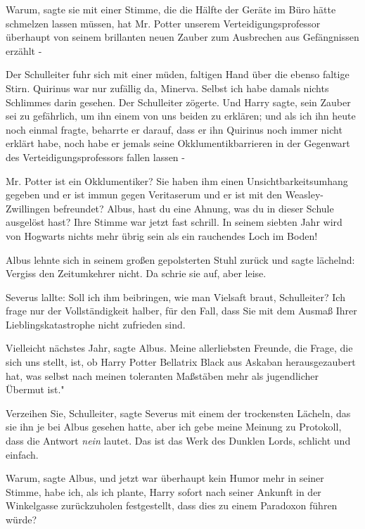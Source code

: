 \glqq{}Warum\grqq{}, sagte sie mit einer Stimme, die die Hälfte der Geräte im
Büro hätte schmelzen lassen müssen, \glqq{}hat Mr. Potter unserem
Verteidigungsprofessor überhaupt von seinem brillanten neuen Zauber zum
Ausbrechen aus Gefängnissen erzählt -\grqq{}

Der Schulleiter fuhr sich mit einer müden, faltigen Hand über die ebenso faltige
Stirn. \glqq{}Quirinus war nur zufällig da, Minerva. Selbst ich habe damals
nichts Schlimmes darin gesehen.\grqq{} Der Schulleiter zögerte. \glqq{}Und Harry
sagte, sein Zauber sei zu gefährlich, um ihn einem von uns beiden zu erklären;
und als ich ihn heute noch einmal fragte, beharrte er darauf, dass er ihn
Quirinus noch immer nicht erklärt habe, noch habe er jemals seine
Okklumentikbarrieren in der Gegenwart des Verteidigungsprofessors fallen lassen
-\grqq{}

\glqq{}Mr. Potter ist ein Okklumentiker? Sie haben ihm einen
Unsichtbarkeitsumhang gegeben und er ist immun gegen Veritaserum und er ist mit
den Weasley-Zwillingen befreundet? Albus, hast du eine Ahnung, was du in dieser
Schule ausgelöst hast?\grqq{} Ihre Stimme war jetzt fast schrill. \glqq{}In
seinem siebten Jahr wird von Hogwarts nichts mehr übrig sein als ein rauchendes
Loch im Boden!\grqq{}

Albus lehnte sich in seinem großen gepolsterten Stuhl zurück und sagte lächelnd:
\glqq{}Vergiss den Zeitumkehrer nicht.\grqq{} Da schrie sie auf, aber leise.

Severus lallte: \glqq{}Soll ich ihm beibringen, wie man Vielsaft braut,
Schulleiter? Ich frage nur der Vollständigkeit halber, für den Fall, dass Sie
mit dem Ausmaß Ihrer Lieblingskatastrophe nicht zufrieden sind.\grqq{}

\glqq{}Vielleicht nächstes Jahr\grqq{}, sagte Albus. \glqq{}Meine allerliebsten
Freunde, die Frage, die sich uns stellt, ist, ob Harry Potter Bellatrix Black
aus Askaban herausgezaubert hat, was selbst nach meinen toleranten Maßstäben
mehr als jugendlicher Übermut ist."

\glqq{}Verzeihen Sie, Schulleiter\grqq{}, sagte Severus mit einem der trockensten
Lächeln, das sie ihn je bei Albus gesehen hatte, \glqq{}aber ich gebe meine
Meinung zu Protokoll, dass die Antwort \emph{nein} lautet. Das ist das Werk des
Dunklen Lords, schlicht und einfach.\grqq{}

\glqq{}Warum\grqq{}, sagte Albus, und jetzt war überhaupt kein Humor mehr in
seiner Stimme, \glqq{}habe ich, als ich plante, Harry sofort nach seiner Ankunft
in der Winkelgasse zurückzuholen festgestellt, dass dies zu einem Paradoxon
führen würde?\grqq{}

